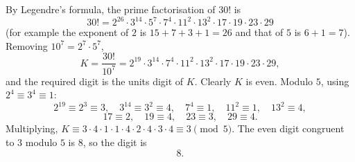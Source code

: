 By Legendre's formula, the prime factorisation of $30!$ is
\[
30!=2^{26}\cdot3^{14}\cdot5^{7}\cdot7^{4}\cdot11^{2}\cdot13^{2}\cdot17\cdot19\cdot23\cdot29
\]
(for example the exponent of $2$ is $15+7+3+1=26$ and that of $5$ is $6+1=7$). Removing $10^7=2^7\cdot5^7$,
\[
K=\dfrac{30!}{10^7}=2^{19}\cdot3^{14}\cdot7^4\cdot11^2\cdot13^2\cdot17\cdot19\cdot23\cdot29,
\]
and the required digit is the units digit of $K$. Clearly $K$ is even. Modulo $5$, using $2^4\equiv3^4\equiv1$:
\[
2^{19}\equiv2^3\equiv3,\quad 3^{14}\equiv3^2\equiv4,\quad 7^4\equiv1,\quad 11^2\equiv1,\quad 13^2\equiv4,
\]
\[
17\equiv2,\quad 19\equiv4,\quad 23\equiv3,\quad 29\equiv4.
\]
Multiplying, $K\equiv3\cdot4\cdot1\cdot1\cdot4\cdot2\cdot4\cdot3\cdot4\equiv3\pmod5$. The even digit congruent to $3$ modulo $5$ is $8$, so the digit is
\[\boxed{8}.\]
